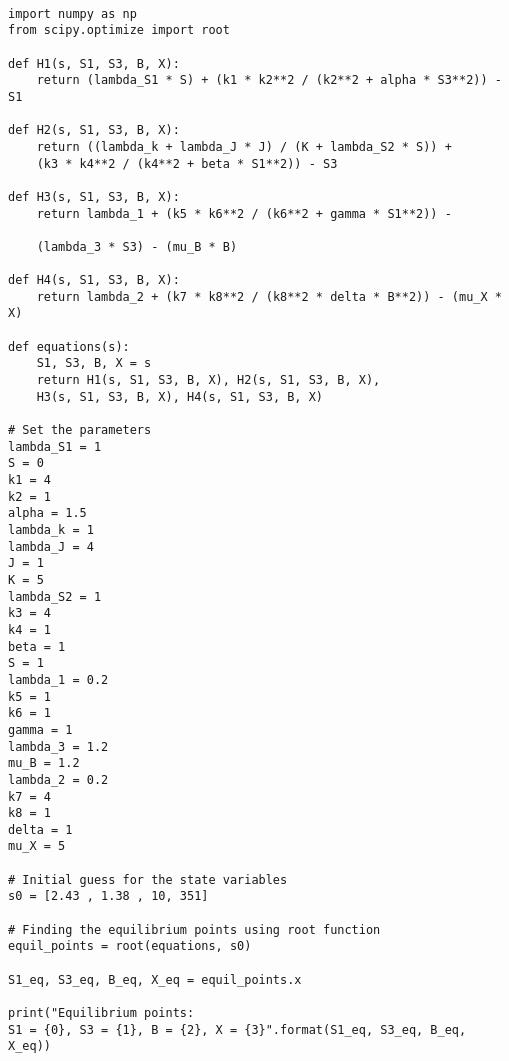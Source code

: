 \begin{framed}
\begin{verbatim}

import numpy as np
from scipy.optimize import root

def H1(s, S1, S3, B, X):
    return (lambda_S1 * S) + (k1 * k2**2 / (k2**2 + alpha * S3**2)) - S1

def H2(s, S1, S3, B, X):
    return ((lambda_k + lambda_J * J) / (K + lambda_S2 * S)) + 
    (k3 * k4**2 / (k4**2 + beta * S1**2)) - S3

def H3(s, S1, S3, B, X):
    return lambda_1 + (k5 * k6**2 / (k6**2 + gamma * S1**2)) - 
    
    (lambda_3 * S3) - (mu_B * B)

def H4(s, S1, S3, B, X):
    return lambda_2 + (k7 * k8**2 / (k8**2 * delta * B**2)) - (mu_X * X)

def equations(s):
    S1, S3, B, X = s
    return H1(s, S1, S3, B, X), H2(s, S1, S3, B, X), 
    H3(s, S1, S3, B, X), H4(s, S1, S3, B, X)

# Set the parameters
lambda_S1 = 1
S = 0
k1 = 4
k2 = 1
alpha = 1.5
lambda_k = 1
lambda_J = 4
J = 1
K = 5
lambda_S2 = 1
k3 = 4
k4 = 1
beta = 1
S = 1
lambda_1 = 0.2
k5 = 1
k6 = 1
gamma = 1
lambda_3 = 1.2
mu_B = 1.2
lambda_2 = 0.2
k7 = 4
k8 = 1
delta = 1
mu_X = 5

# Initial guess for the state variables
s0 = [2.43 , 1.38 , 10, 351]

# Finding the equilibrium points using root function
equil_points = root(equations, s0)

S1_eq, S3_eq, B_eq, X_eq = equil_points.x

print("Equilibrium points: 
S1 = {0}, S3 = {1}, B = {2}, X = {3}".format(S1_eq, S3_eq, B_eq, X_eq))

\end{verbatim}
\end{framed}



\\




















